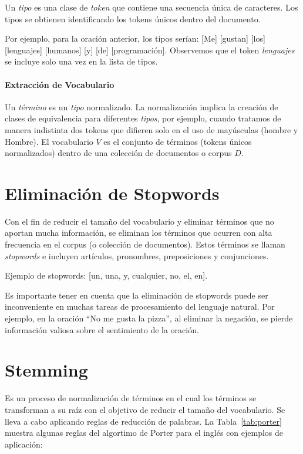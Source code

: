 Un \emph{tipo} es una clase de \emph{token} que contiene una secuencia única de caracteres. Los tipos se obtienen identificando los tokens únicos dentro del documento.

Por ejemplo, para la oración anterior, los tipos serían: [Me] [gustan] [los] [lenguajes] [humanos] [y] [de] [programación]. Observemos que el token \emph{lenguajes} se incluye solo una vez en la lista de tipos.

\paragraph{Extracción de Vocabulario}

Un \emph{término} es un \emph{tipo} normalizado. La normalización implica la creación de clases de equivalencia para diferentes \emph{tipos}, por ejemplo, cuando tratamos de manera indistinta dos tokens que difieren solo en el uso de mayúsculas (hombre y Hombre). El vocabulario $V$ es el conjunto de términos (tokens únicos normalizados) dentro de una colección de documentos o corpus $D$.

\section{Eliminación de Stopwords}

Con el fin de reducir el tamaño del vocabulario y eliminar términos que no aportan mucha información, se eliminan los términos que ocurren con alta frecuencia en el corpus (o colección de documentos). Estos términos se llaman \emph{stopwords} e incluyen artículos, pronombres, preposiciones y conjunciones.

Ejemplo de stopwords: [un, una, y, cualquier, no, el, en].

Es importante tener en cuenta que la eliminación de stopwords puede ser inconveniente en muchas tareas de procesamiento del lenguaje natural. Por ejemplo, en la oración ``No me gusta la pizza'', al eliminar la negación, se pierde información valiosa sobre el sentimiento de la oración.

\section{Stemming}

Es un proceso de normalización de términos en el cual los términos se transforman a su raíz con el objetivo de reducir el tamaño del vocabulario. Se lleva a cabo aplicando reglas de reducción de palabras. La Tabla~\ref{tab:porter} muestra  algunas reglas del algortimo de Porter para el inglés con ejemplos de aplicación:

